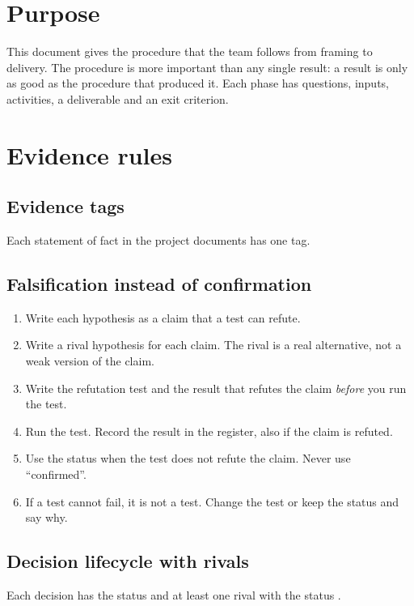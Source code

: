 \documentclass[11pt]{article}
\begin{document}
\makedoctitle
\tableofcontents
\clearpage

\section{Purpose}
This document gives the procedure that the team follows from framing to delivery.
The procedure is more important than any single result: a result is only as good as the procedure that produced it.
Each phase has questions, inputs, activities, a deliverable and an exit criterion.

\section{Evidence rules}
\subsection{Evidence tags}
Each statement of fact in the project documents has one tag.

\taglegend

\subsection{Falsification instead of confirmation}
\begin{enumerate}
  \item Write each hypothesis as a claim that a test can refute.
  \item Write a rival hypothesis for each claim. The rival is a real alternative, not a weak version of the claim.
  \item Write the refutation test and the result that refutes the claim \emph{before} you run the test.
  \item Run the test. Record the result in the register, also if the claim is refuted.
  \item Use the status  when the test does not refute the claim. Never use ``confirmed''.
  \item If a test cannot fail, it is not a test. Change the test or keep the status  and say why.
\end{enumerate}

\subsection{Decision lifecycle with rivals}
Each decision has the status \sWorking{} and at least one rival with the status \sProposed.
\end{document}

